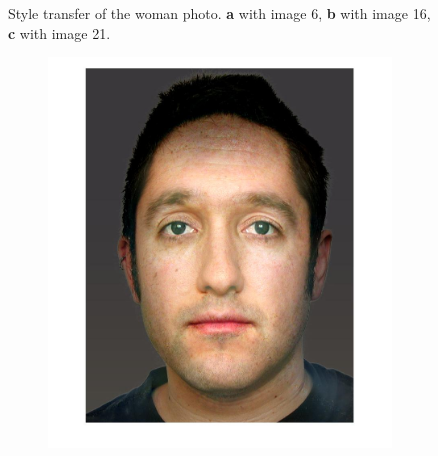\documentclass[a4paper]{iacas}
\begin{document}
\begin{figure}[!htbp]
	\caption{Style transfer of the woman photo. \textbf{a} with image 6, \textbf{b} with image 16, \textbf{c} with image 21.}
	\label{fig:Woman}
\end{figure}

\begin{figure}[!htbp]
	
	\begin{subfigure}[b]{0.32\textwidth}
		\includegraphics[width=\textwidth]{image_61_0.jpg}
		\caption{}
		\label{fig:i_61_0}
	\end{subfigure}
	\begin{subfigure}[b]{0.32\textwidth}

\end{subfigure}
\end{figure}
\end{document}
